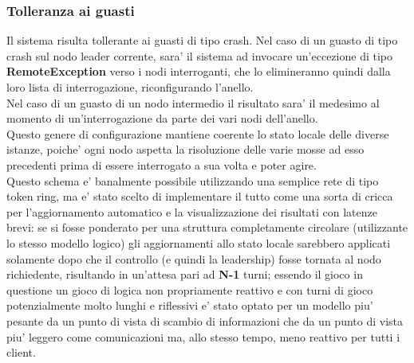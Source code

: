 \subsubsection{Tolleranza ai guasti}
	Il sistema risulta tollerante ai guasti di tipo crash.
	Nel caso di un guasto di tipo crash sul nodo leader corrente, sara' il
	sistema ad invocare un'eccezione di tipo \textbf{RemoteException} verso
	i nodi interroganti, che lo elimineranno quindi dalla loro lista di
	interrogazione, riconfigurando l'anello.\\
	Nel caso di un guasto di un nodo intermedio il risultato sara' il
	medesimo al momento di un'interrogazione da parte dei vari nodi
	dell'anello.\\
	Questo genere di configurazione mantiene coerente lo stato locale delle
	diverse istanze, poiche' ogni nodo aspetta la risoluzione delle varie
	mosse ad esso precedenti prima di essere interrogato a sua volta e poter
	agire.\\
	Questo schema e' banalmente possibile utilizzando una semplice rete di
	tipo token ring, ma e' stato scelto di implementare il tutto come una
	sorta di cricca per l'aggiornamento automatico e la visualizzazione dei
	risultati con latenze brevi: se si fosse ponderato per una struttura
	completamente circolare (utilizzante lo stesso modello logico) gli
	aggiornamenti allo stato locale sarebbero applicati solamente dopo che
	il controllo (e quindi la leadership) fosse tornata al nodo richiedente,
	risultando in un'attesa pari ad \textbf{N-1} turni; essendo il gioco
	in questione un gioco di logica non propriamente reattivo e con turni
	di gioco potenzialmente molto lunghi e riflessivi e' stato optato
	per un modello piu' pesante da un punto di vista
	di scambio di informazioni che da un punto di vista piu' leggero come
	comunicazioni ma, allo stesso tempo, meno reattivo per tutti i client.

